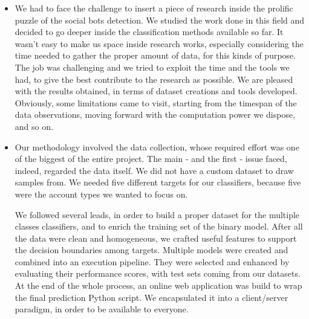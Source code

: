 \begin{itemize}
\item[\PencilRight] We had to face the challenge to insert a piece of research inside the prolific puzzle of the social bots detection. We studied the work done in this field and decided to go deeper inside the classification methods available so far. It wasn't easy to make us space inside research works, especially considering the time needed to gather the proper amount of data, for this kinds of purpose. The job was challenging and we tried to exploit the time and the tools we had, to give the best contribute to the research as possible. We are pleased with the results obtained, in terms of dataset creations and tools developed. Obviously, some limitations came to visit, starting from the timespan of the data observations, moving forward with the computation power we dispose, and so on.
\item[\PencilRight] Our methodology involved the data collection, whose required effort was one of the biggest of the entire project. The main - and the first - issue faced, indeed, regarded the data itself. We did not have a custom dataset to draw samples from. We needed five different targets for our classifiers, because five were the account types we wanted to focus on. 

We followed several leads, in order to build a proper dataset for the multiple classes classifiers, and to enrich the training set of the binary model. After all the data were clean and homogeneous, we crafted useful features to support the decision boundaries among targets. Multiple models were created and combined into an execution pipeline. They were selected and enhanced by evaluating their performance scores, with test sets coming from our datasets. 
At the end of the whole process, an online web application was build to wrap the final prediction Python script. We encapsulated it into a client/server paradigm, in order to be available to everyone.


\end{itemize}
